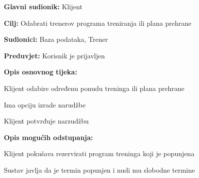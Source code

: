				\noindent {}
					\begin{packed_item}
	
						\item \textbf{Glavni sudionik: } Klijent
						\item  \textbf{Cilj:} Odabrati trenerov programa treniranja ili plana prehrane
						\item  \textbf{Sudionici:} Baza podataka, Trener
						\item  \textbf{Preduvjet:} Korisnik je prijavljen
						\item  \textbf{Opis osnovnog tijeka:}
						
						\item[] \begin{packed_enum}
	
							\item Klijent odabire određenu ponudu treninga ili plana prehrane
							\item Ima opciju izrade narudžbe
							\item Klijent potvrđuje narzudžbu
						\end{packed_enum}
						
						\item  \textbf{Opis mogućih odstupanja:}
						
						\item[] \begin{packed_item}
	
							\item[-] Klijent pokušava rezervirati program treninga koji je popunjena
							\item[] \begin{packed_enum}
								
								\item Sustav javlja da je termin popunjen i nudi mu slobodne termine
								
							\end{packed_enum}
							
						\end{packed_item}
					\end{packed_item}
					
